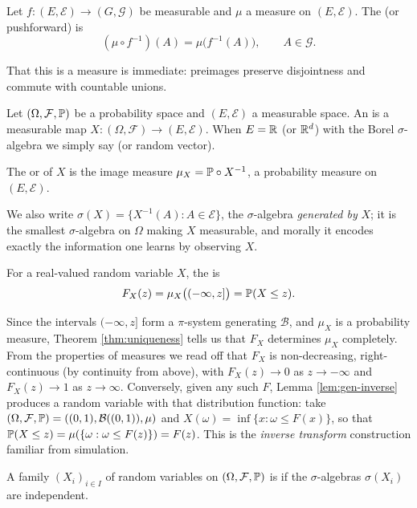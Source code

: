 \documentclass[a4paper]{scrartcl}
\newcommand{\cB}{\mathcal{B}}
\newcommand{\cE}{\mathcal{E}}
\newcommand{\cF}{\mathcal{F}}
\newcommand{\cG}{\mathcal{G}}
\begin{document}
\begin{definition}
	Let $f : (E,\cE) \to (G,\cG)$ be measurable and $\mu$ a measure on $(E,\cE)$. The  (or pushforward) is
	$$
	(\mu \circ f^{-1})(A) = \mu\big(f^{-1}(A)\big), \qquad A \in \cG.
	$$
\end{definition}

That this is a measure is immediate: preimages preserve disjointness and commute with countable unions.

\begin{definition}
	Let $(\Omega, \cF, \PP)$ be a probability space and $(E,\cE)$ a measurable space. An  is a measurable map $X : (\Omega, \cF) \to (E,\cE)$. When $E = \mathbb{R}$ (or $\mathbb{R}^d$) with the Borel $\sigma$-algebra we simply say  (or random vector).

	The  or  of $X$ is the image measure $\mu_X = \mathbb{P} \circ X^{-1}$, a probability measure on $(E,\cE)$.
\end{definition}

We also write $\sigma(X) = \{X^{-1}(A) : A \in \cE\}$, the $\sigma$-algebra \emph{generated by} $X$; it is the smallest $\sigma$-algebra on $\Omega$ making $X$ measurable, and morally it encodes exactly the information one learns by observing $X$.

\begin{definition}
	For a real-valued random variable $X$, the  is
	$$
	F_X(z) = \mu_X\big((-\infty,z]\big) = \mathbb{P}(X \leq z).
	$$
\end{definition}

Since the intervals $(-\infty,z]$ form a $\pi$-system generating $\cB$, and $\mu_X$ is a probability measure, Theorem \ref{thm:uniqueness} tells us that $F_X$ determines $\mu_X$ completely. From the properties of measures we read off that $F_X$ is non-decreasing, right-continuous (by continuity from above), with $F_X(z) \to 0$ as $z \to -\infty$ and $F_X(z) \to 1$ as $z \to \infty$. Conversely, given any such $F$, Lemma \ref{lem:gen-inverse} produces a random variable with that distribution function: take $(\Omega,\cF,\PP) = ((0,1), \cB((0,1)), \mu)$ and $X(\omega) = \inf\{x : \omega \leq F(x)\}$, so that $\mathbb{P}(X \leq z) = \mu(\{\omega : \omega \leq F(z)\}) = F(z)$. This is the \emph{inverse transform} construction familiar from simulation.

\begin{definition}
	A family $(X_i)_{i \in I}$ of random variables on $(\Omega,\cF,\PP)$ is  if the $\sigma$-algebras $\sigma(X_i)$ are independent.
\end{definition}
\end{document}

